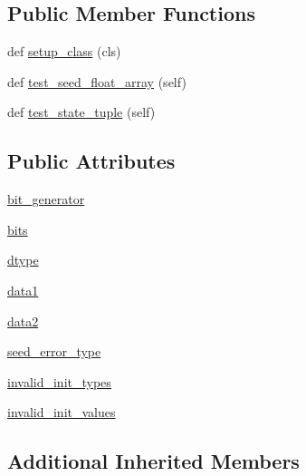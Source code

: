 \subsection*{Public Member Functions}
\begin{DoxyCompactItemize}
\item 
def \hyperlink{classnumpy_1_1random_1_1tests_1_1test__direct_1_1TestMT19937_a1dcf37d7079919353562e9f805b690eb}{setup\+\_\+class} (cls)
\item 
def \hyperlink{classnumpy_1_1random_1_1tests_1_1test__direct_1_1TestMT19937_a64335a4735aadab334736bcaca92d0b7}{test\+\_\+seed\+\_\+float\+\_\+array} (self)
\item 
def \hyperlink{classnumpy_1_1random_1_1tests_1_1test__direct_1_1TestMT19937_ae67f1514b87cd9eabbd1d5b66e056c1a}{test\+\_\+state\+\_\+tuple} (self)
\end{DoxyCompactItemize}
\subsection*{Public Attributes}
\begin{DoxyCompactItemize}
\item 
\hyperlink{classnumpy_1_1random_1_1tests_1_1test__direct_1_1TestMT19937_abc2fceaf615d5a0e1c292965c312ad5e}{bit\+\_\+generator}
\item 
\hyperlink{classnumpy_1_1random_1_1tests_1_1test__direct_1_1TestMT19937_a480b500a061e449ae6831a9128da9171}{bits}
\item 
\hyperlink{classnumpy_1_1random_1_1tests_1_1test__direct_1_1TestMT19937_a9e6af1d6cb97b9249cf79d48da9a9a54}{dtype}
\item 
\hyperlink{classnumpy_1_1random_1_1tests_1_1test__direct_1_1TestMT19937_ab37b95725b53b8b7ed91de9fc648af00}{data1}
\item 
\hyperlink{classnumpy_1_1random_1_1tests_1_1test__direct_1_1TestMT19937_ac87c967aff4b342b6ce020eea6e89560}{data2}
\item 
\hyperlink{classnumpy_1_1random_1_1tests_1_1test__direct_1_1TestMT19937_a4ec282938aba1f3ce6f8b62a8545ac4a}{seed\+\_\+error\+\_\+type}
\item 
\hyperlink{classnumpy_1_1random_1_1tests_1_1test__direct_1_1TestMT19937_aae7f170952fc753078b57d29b08e33b6}{invalid\+\_\+init\+\_\+types}
\item 
\hyperlink{classnumpy_1_1random_1_1tests_1_1test__direct_1_1TestMT19937_a3a1875007f880d419780fecc1843f45f}{invalid\+\_\+init\+\_\+values}
\end{DoxyCompactItemize}
\subsection*{Additional Inherited Members}


